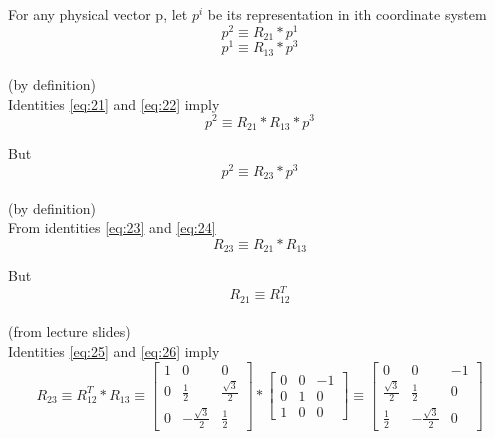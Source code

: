 \documentclass[12pt]{article}
\newcommand{\fromslides}{{\\ \color{blue} \hspace*{\fill}(from lecture slides)} \\}
\newcommand{\bydefn}{{\\ \color{blue} \hspace*{\fill}(by definition)} \\}
\begin{document}
For any physical vector p, let $ p^{i} $ be its representation in ith coordinate system
\begin{equation}
  \label{eq:21}
  p^{2} \equiv R_{21} * p^{1}
\end{equation}
\begin{equation}
  \label{eq:22}
  p^{1} \equiv R_{13} * p^{3}
\end{equation}
\bydefn

Identities \ref{eq:21} and \ref{eq:22} imply
\begin{equation}
  \label{eq:23}
  p^{2} \equiv R_{21} * R_{13} * p^{3}
\end{equation}

But
\begin{equation}
  \label{eq:24}
  p^{2} \equiv R_{23} * p^{3}
\end{equation}
\bydefn

From identities \ref{eq:23} and \ref{eq:24}
\begin{equation}
  \label{eq:25}
  R_{23} \equiv R_{21} * R_{13}
\end{equation}

But
\begin{equation}
  \label{eq:26}
  R_{21} \equiv R_{12}^{T}
\end{equation}
\fromslides

Identities \ref{eq:25} and \ref{eq:26} imply
\begin{equation}
  \label{eq:27}
  R_{23} \equiv R_{12}^T * R_{13}
  \equiv \begin{bmatrix} 1 & 0 & 0 \\ 0 & \frac{1}{2} & \frac{\sqrt{3}}{2} \\ 0 & -\frac{\sqrt{3}}{2} & \frac{1}{2} \end{bmatrix} * \begin{bmatrix} 0 & 0 & -1 \\ 0 & 1 & 0 \\ 1 & 0 & 0 \end{bmatrix}
  \equiv \begin{bmatrix} 0 & 0 & -1 \\ \frac{\sqrt{3}}{2} & \frac{1}{2} & 0 \\ \frac{1}{2} & -\frac{\sqrt{3}}{2} & 0 \end{bmatrix}
\end{equation}

\pagebreak

\section{}
\end{document}
